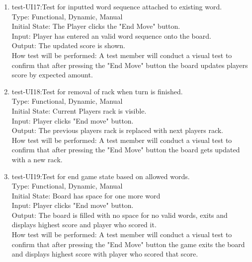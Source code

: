 \documentclass[12pt, titlepage]{article}
\begin{document}
\begin{enumerate}
    \item{test-UI17:Test for inputted word sequence attached to existing word.\\} %
    Type: Functional, Dynamic, Manual\\
    Initial State: The Player clicks the "End Move" button.\\
    Input: Player has entered an valid word sequence onto the board. \\
    Output: The updated score is shown. \\
    How test will be performed: A test member will conduct a visual test to confirm that after pressing the "End Move" button the board updates players score by expected amount.\\
    
    \item{test-UI18:Test for removal of rack when turn is finished.\\} %
    Type: Functional, Dynamic, Manual\\
    Initial State: Current Players rack is visible.\\
    Input: Player clicks "End move" button. \\
    Output: The previous players rack is replaced with next players rack. \\
    How test will be performed: A test member will conduct a visual test to confirm that after pressing the "End Move" button the board gets updated with a new rack.\\
    
    \item{test-UI19:Test for end game state based on allowed words.\\} %
    Type: Functional, Dynamic, Manual\\
    Initial State: Board has space for one more word\\
    Input: Player clicks "End move" button. \\
    Output: The board is filled with no space for no valid words, exits and displays highest score and player who scored it. \\
    How test will be performed: A test member will conduct a visual test to confirm that after pressing the "End Move" button the game exits the board and displays highest score with player who scored that score.\\
    

\end{enumerate}
\end{document}
